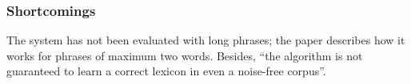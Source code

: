 \documentclass[10pt,journal,letterpaper,compsoc]{IEEEtran}
\begin{document}
\subsubsection{Shortcomings}
The system has not been evaluated with long phrases; the paper describes how it
works for phrases of maximum two words. Besides, ``the algorithm is not
guaranteed to learn a correct lexicon in even a noise-free corpus''. 














\end{document}
